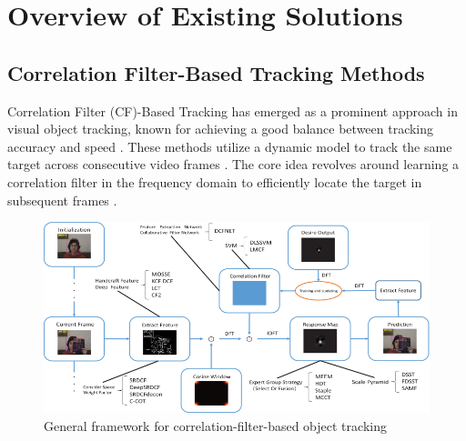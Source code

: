 \chapter{Overview of Existing Solutions}
\label{ch:chap2}

\section{Correlation Filter-Based Tracking Methods}
\label{sec:tradi}

Correlation Filter (CF)-Based Tracking has emerged as a prominent approach in visual object tracking, known for achieving a good balance between tracking accuracy and speed \cite{feng2019dynamic}. These methods utilize a dynamic model to track the same target across consecutive video frames \cite{du2021overview}. The core idea revolves around learning a correlation filter in the frequency domain to efficiently locate the target in subsequent frames \cite{zhao2020correlation}.

\begin{figure}[h]
    \centering
    \includegraphics[width=1\linewidth]{images/General framework for correlation-filter-based object tracking.png}
    \caption{General framework for correlation-filter-based object tracking \cite{du2021overview}}
    \label{fig:CF-general-framework}
\end{figure}

